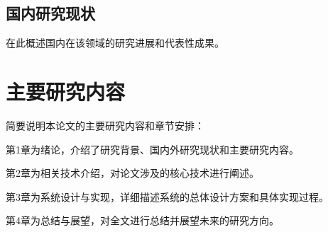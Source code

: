 \subsection{国内研究现状}

在此概述国内在该领域的研究进展和代表性成果\cite{example_thesis}。

\section{主要研究内容}

简要说明本论文的主要研究内容和章节安排：

第1章为绪论，介绍了研究背景、国内外研究现状和主要研究内容。

第2章为相关技术介绍，对论文涉及的核心技术进行阐述。

第3章为系统设计与实现，详细描述系统的总体设计方案和具体实现过程。

第4章为总结与展望，对全文进行总结并展望未来的研究方向。
